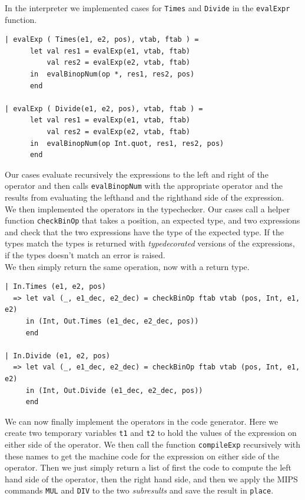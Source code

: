 \documentclass[11pt]{article}
\begin{document}
    In the interpreter we implemented cases for \texttt{Times} and
    \texttt{Divide} in the \texttt{evalExpr} function.

    \begin{lstlisting}[basicstyle=\small]
| evalExp ( Times(e1, e2, pos), vtab, ftab ) =
      let val res1 = evalExp(e1, vtab, ftab)
          val res2 = evalExp(e2, vtab, ftab)
      in  evalBinopNum(op *, res1, res2, pos)
      end

| evalExp ( Divide(e1, e2, pos), vtab, ftab ) =
      let val res1 = evalExp(e1, vtab, ftab)
          val res2 = evalExp(e2, vtab, ftab)
      in  evalBinopNum(op Int.quot, res1, res2, pos)
      end
    \end{lstlisting}

    Our cases evaluate recursively the expressions to the left and right of the
    operator and then calls \texttt{evalBinopNum} with the appropriate operator
    and the results from evaluating the lefthand and the righthand side of the
    expression. \\

    We then implemented the operators in the typechecker.  Our cases call a
    helper function \texttt{checkBinOp} that takes a position, an expected type,
    and two expressions and check that the two expressions have the type of the
    expected type.  If the types match the types is returned with
    \textit{typedecorated} versions of the expressions, if the types doesn't
    match an error is raised. \\
    We then simply return the same operation, now with a return type.

    \begin{lstlisting}[basicstyle=\small]
| In.Times (e1, e2, pos)
  => let val (_, e1_dec, e2_dec) = checkBinOp ftab vtab (pos, Int, e1, e2)
     in (Int, Out.Times (e1_dec, e2_dec, pos))
     end

| In.Divide (e1, e2, pos)
  => let val (_, e1_dec, e2_dec) = checkBinOp ftab vtab (pos, Int, e1, e2)
     in (Int, Out.Divide (e1_dec, e2_dec, pos))
     end
    \end{lstlisting}

    We can now finally implement the operators in the code generator.  Here we
    create two temporary variables \texttt{t1} and \texttt{t2} to hold the
    values of the expression on either side of the operator.  We then call the
    function \texttt{compileExp} recursively with these names to get the machine
    code for the expression on either side of the operator.  Then we just simply
    return a list of first the code to compute the left hand side of the
    operator, then the right hand side, and then we apply the MIPS commands
    \texttt{MUL} and \texttt{DIV} to the two \textit{subresults} and save the
    result in \texttt{place}.
\end{document}
